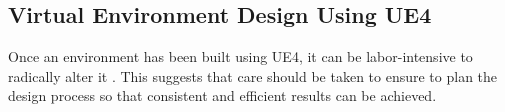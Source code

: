 


\subsection{Virtual Environment Design Using UE4}
Once an environment has been built using UE4, it can be labor-intensive to radically alter it \cite[p.~454]{Rouse2005GamePractice}. This suggests that care should be taken to ensure to plan the design process so that consistent and efficient results can be achieved.

